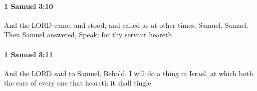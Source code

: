		\paragraph{1 Samuel 3:10} %
			\label{1SAMUEL-3-10}

			And the LORD came, and stood, and called as at other times, Samuel, Samuel. Then Samuel answered, Speak; for thy servant heareth.


		\paragraph{1 Samuel 3:11} %
			\label{1SAMUEL-3-11}

			And the LORD said to Samuel, Behold, I will do a thing in Israel, at which both the ears of every one that heareth it shall tingle.


